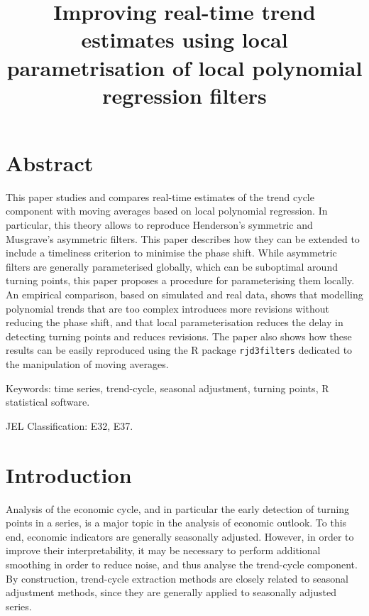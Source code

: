 \documentclass[
]{article}
\title{Improving real-time trend estimates using local parametrisation
of local polynomial regression filters}
\author{}
\date{}
\newcommand\1{\mathds{1}}
\begin{document}
\maketitle
\ifdefined\Shaded\renewenvironment{Shaded}{\begin{tcolorbox}[enhanced, interior hidden, sharp corners, borderline west={3pt}{0pt}{shadecolor}, boxrule=0pt, breakable, frame hidden]}{\end{tcolorbox}}\fi

\hypertarget{abstract}{%
\section*{Abstract}\label{abstract}}

This paper studies and compares real-time estimates of the trend cycle
component with moving averages based on local polynomial regression. In
particular, this theory allows to reproduce Henderson's symmetric and
Musgrave's asymmetric filters. This paper describes how they can be
extended to include a timeliness criterion to minimise the phase shift.
While asymmetric filters are generally parameterised globally, which can
be suboptimal around turning points, this paper proposes a procedure for
parameterising them locally. An empirical comparison, based on simulated
and real data, shows that modelling polynomial trends that are too
complex introduces more revisions without reducing the phase shift, and
that local parameterisation reduces the delay in detecting turning
points and reduces revisions. The paper also shows how these results can
be easily reproduced using the R package \texttt{rjd3filters} dedicated
to the manipulation of moving averages.

Keywords: time series, trend-cycle, seasonal adjustment, turning points,
R statistical software.

JEL Classification: E32, E37.

\hypertarget{introduction}{%
\section*{Introduction}\label{introduction}}

Analysis of the economic cycle, and in particular the early detection of
turning points in a series, is a major topic in the analysis of economic
outlook. To this end, economic indicators are generally seasonally
adjusted. However, in order to improve their interpretability, it may be
necessary to perform additional smoothing in order to reduce noise, and
thus analyse the trend-cycle component. By construction, trend-cycle
extraction methods are closely related to seasonal adjustment methods,
since they are generally applied to seasonally adjusted series.
\end{document}
